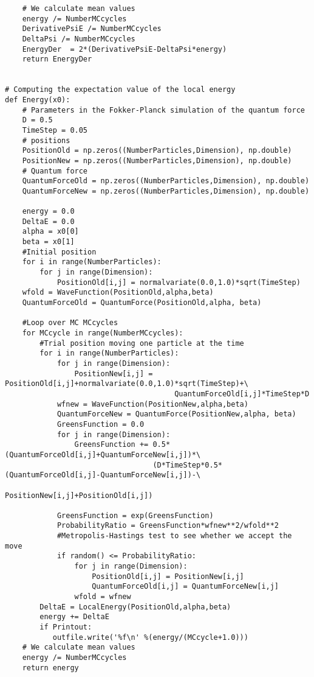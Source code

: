 \documentclass{beamer}
\begin{document}
\begin{frame}
\begin{verbatim}
    # We calculate mean values
    energy /= NumberMCcycles
    DerivativePsiE /= NumberMCcycles
    DeltaPsi /= NumberMCcycles
    EnergyDer  = 2*(DerivativePsiE-DeltaPsi*energy)
    return EnergyDer


# Computing the expectation value of the local energy 
def Energy(x0):
    # Parameters in the Fokker-Planck simulation of the quantum force
    D = 0.5
    TimeStep = 0.05
    # positions
    PositionOld = np.zeros((NumberParticles,Dimension), np.double)
    PositionNew = np.zeros((NumberParticles,Dimension), np.double)
    # Quantum force
    QuantumForceOld = np.zeros((NumberParticles,Dimension), np.double)
    QuantumForceNew = np.zeros((NumberParticles,Dimension), np.double)

    energy = 0.0
    DeltaE = 0.0
    alpha = x0[0]
    beta = x0[1]
    #Initial position
    for i in range(NumberParticles):
        for j in range(Dimension):
            PositionOld[i,j] = normalvariate(0.0,1.0)*sqrt(TimeStep)
    wfold = WaveFunction(PositionOld,alpha,beta)
    QuantumForceOld = QuantumForce(PositionOld,alpha, beta)

    #Loop over MC MCcycles
    for MCcycle in range(NumberMCcycles):
        #Trial position moving one particle at the time
        for i in range(NumberParticles):
            for j in range(Dimension):
                PositionNew[i,j] = PositionOld[i,j]+normalvariate(0.0,1.0)*sqrt(TimeStep)+\
                                       QuantumForceOld[i,j]*TimeStep*D
            wfnew = WaveFunction(PositionNew,alpha,beta)
            QuantumForceNew = QuantumForce(PositionNew,alpha, beta)
            GreensFunction = 0.0
            for j in range(Dimension):
                GreensFunction += 0.5*(QuantumForceOld[i,j]+QuantumForceNew[i,j])*\
	                              (D*TimeStep*0.5*(QuantumForceOld[i,j]-QuantumForceNew[i,j])-\
                                      PositionNew[i,j]+PositionOld[i,j])
      
            GreensFunction = exp(GreensFunction)
            ProbabilityRatio = GreensFunction*wfnew**2/wfold**2
            #Metropolis-Hastings test to see whether we accept the move
            if random() <= ProbabilityRatio:
                for j in range(Dimension):
                    PositionOld[i,j] = PositionNew[i,j]
                    QuantumForceOld[i,j] = QuantumForceNew[i,j]
                wfold = wfnew
        DeltaE = LocalEnergy(PositionOld,alpha,beta)
        energy += DeltaE
        if Printout: 
           outfile.write('%f\n' %(energy/(MCcycle+1.0)))            
    # We calculate mean values
    energy /= NumberMCcycles
    return energy


\end{verbatim}
\end{frame}
\end{document}

